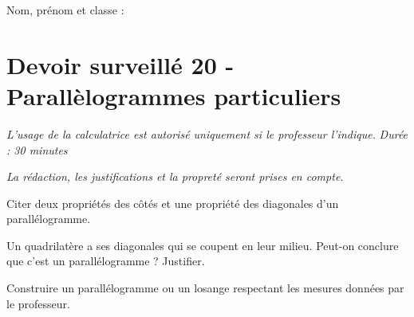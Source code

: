 \documentclass[a4paper,10pt]{report}
\begin{document}
\pagestyle{empty}
\noindent Nom, prénom et classe : \dotfill

\section*{Devoir surveillé 20 - Parallèlogrammes particuliers}

\noindent \textit{L'usage de la calculatrice est autorisé uniquement si le professeur l'indique.} \hfill \textit{Durée : 30 minutes}

\medskip
\noindent \textit{La rédaction, les justifications et la propreté seront prises en compte.}


\begin{ex}[Propriétés]
Citer deux propriétés des côtés et une propriété des diagonales d'un parallélogramme.
\medskip\noindent\grandscarreaux{\linewidth}{3cm}
\end{ex}
\begin{ex}[Reconnaître]
Un quadrilatère a ses diagonales qui se coupent en leur milieu. Peut-on conclure que c'est un parallélogramme ? Justifier.
\medskip\noindent\grandscarreaux{\linewidth}{3cm}
\end{ex}
\begin{ex}[Construction]
Construire un parallélogramme ou un losange respectant les mesures données par le professeur.
\medskip\noindent\grandscarreaux{\linewidth}{6cm}
\end{ex}
\end{document}
